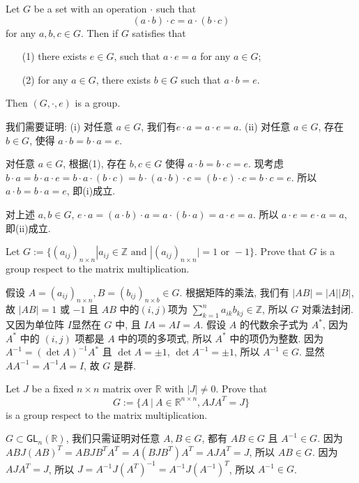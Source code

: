 \documentclass{exam-zh}
\newcommand{\ZZ}{{\mathbb{Z}}}
\newcommand{\RR}{{\mathbb{R}}}
\newcommand{\Gl}{{\mathsf{GL}}}
\begin{document}
\begin{question}
  Let $G$ be a set with an operation $\cdot$ such that\[ (a\cdot b)\cdot c = a \cdot (b\cdot c)\] for any $a, b, c\in G$. Then if $G$ satisfies that
  \begin{enumerate}
    \item[(1)] there exists $e\in G$, such that $a\cdot e = a$ for any $a\in G$;
    \item[(2)] for any $a\in G$, there exists $b\in G$ such that $a\cdot b=e$.
  \end{enumerate}
  Then $(G, \cdot, e)$ is a group.
\end{question}
\begin{solution}
  我们需要证明: (i) 对任意 $a\in G$, 我们有$e\cdot a = a\cdot e=a$.  (ii) 对任意 $a\in G$, 存在 $b\in G$, 使得 $a\cdot b= b\cdot a=e$.
  
  对任意 $a\in G$, 根据(1), 存在 $b, c\in G$ 使得 $a\cdot b = b\cdot c=e$. 现考虑 $b\cdot a = b\cdot a \cdot e =b\cdot a\cdot (b\cdot c)=b\cdot (a\cdot b)\cdot c=(b\cdot e)\cdot c=b\cdot c=e$. 所以 $a\cdot b=b\cdot a=e$, 即(i)成立.
  
  对上述 $a, b\in G$, $e\cdot a= (a\cdot b)\cdot a=a\cdot (b\cdot a)=a\cdot e=a$. 所以 $a\cdot e=e\cdot a =a$, 即(ii)成立. 
\end{solution}
\begin{question}
  Let $G:=\{(a_{ij})_{n\times n} | a_{ij}\in \ZZ \text{ and } |(a_{ij})_{n\times n}|=1 \text{ or }-1\}$. Prove that $G$ is a group respect to the matrix multiplication.
\end{question}
\begin{solution}
 假设 $A=(a_{ij})_{n\times n}, B=(b_{ij})_{n\times b}\in G$. 根据矩阵的乘法, 我们有 $|AB|=|A||B|$, 故 $|AB|=1$ 或 $-1$ 且 $AB$ 中的$(i,j)$项为 $\sum_{k=1}^n a_{ik}b_{kj}\in\ZZ$, 所以 $G$ 对乘法封闭. 又因为单位阵 $I$显然在 $G$ 中, 且 $IA=AI=A$. 假设 $A$ 的代数余子式为 $A^*$, 因为 $A^*$ 中的 $(i,j)$ 项都是 $A$ 中的项的多项式, 所以 $A^*$ 中的项仍为整数. 因为 $A^{-1}=(\det A)^{-1}A^*$ 且 $\det A=\pm 1$, $\det A^{-1}=\pm 1$, 所以 $A^{-1}\in G$. 显然 $AA^{-1}=A^{-1}A=I$, 故 $G$ 是群.
\end{solution}
\begin{question}
  Let $J$ be a fixed $n\times n$ matrix over $\RR$ with $|J|\neq 0$. Prove that\[G:=\{A\  |\  A\in \RR^{n\times n}, AJA^T=J\}\]is a group respect to the matrix multiplication.
\end{question}
\begin{solution}
  $G\subset \Gl_n(\RR)$, 我们只需证明对任意 $A, B\in G$, 都有 $AB\in G$ 且 $A^{-1}\in G$. 因为 $ABJ(AB)^T=ABJB^TA^T=A(BJB^T)A^T=AJA^T=J$, 所以 $AB\in G$. 因为 $AJA^T=J$, 所以 $J=A^{-1}J(A^T)^{-1}=A^{-1}J(A^{-1})^T$, 所以 $A^{-1}\in G$.
\end{solution}
\end{document}
